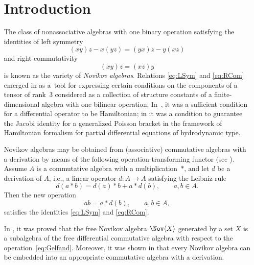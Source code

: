 \section{Introduction}%

The class of nonassociative algebras with one binary operation satisfying the identities of left symmetry
%
\begin{equation}\label{eq:LSym}
(xy)z - x(yz) = (yx)z - y(xz)
\end{equation}
%
and right commutativity
%
\begin{equation}\label{eq:RCom}
(xy)z = (xz)y
\end{equation}
%
is known as the variety of {\em Novikov algebras}.
Relations \eqref{eq:LSym} and \eqref{eq:RCom} emerged
in \cite{BN1985, GD79} as a~tool
for expressing certain conditions on the components of
a tensor of rank~3 considered
as a collection of structure constants of a finite-dimensional
 algebra with one bilinear operation.
 In~\cite{GD79}, it was a sufficient condition
for a differential operator to be Hamiltonian;
in \cite{BN1985} it was a condition to guarantee
the Jacobi identity for a generalized Poisson bracket in
the framework of Hamiltonian formalism for partial differential
equations of hydrodynamic type.

Novikov algebras may be obtained from (associative) commutative algebras
with a derivation by means of the following operation-transforming functor (see \cite{GD79}).
Assume $A$ is a commutative algebra
with a multiplication~$*$, and let $d$ be a derivation of $A$, i.e.,
 a linear operator $d\colon A\to A$
satisfying the Leibniz rule
\[
d(a*b) = d(a)*b+a*d(b), \qquad a,b\in A.
\]
Then the new operation
\begin{equation}\label{eq:Gelfand}
ab = a*d(b), \qquad a,b\in A,
\end{equation}
satisfies the identities \eqref{eq:LSym} and \eqref{eq:RCom}.

In \cite{DzhLofwall2002}, it was proved that the free Novikov
algebra $\Nov \langle X\rangle $ generated by a set $X$ is
a subalgebra of the free differential commutative algebra
with respect to the operation~\eqref{eq:Gelfand}.
Moreover, it was shown in \cite{BCZ-2017} that every Novikov algebra
can be embedded into an appropriate
commutative algebra with a derivation.

